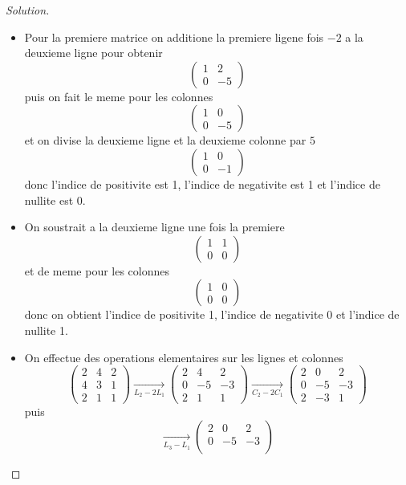 \documentclass[a4paper,12pt,french]{report}
\theoremstyle{plain}
\theoremstyle{definition}
\begin{document}
\begin{proof}[Solution]
\begin{itemize}
\item Pour la premiere matrice on additione la premiere ligene fois $-2$ a la deuxieme ligne pour obtenir
$$
\begin{pmatrix}
1 & 2 \\
0 & -5
\end{pmatrix}
$$
puis on fait le meme pour les colonnes 
$$
\begin{pmatrix}
1 & 0 \\
0 & -5
\end{pmatrix}
$$
et on divise la deuxieme ligne et la deuxieme colonne par $5$
$$
\begin{pmatrix}
 1 & 0 \\
0 & -1
\end{pmatrix}
$$
donc l'indice de positivite est 1, l'indice de negativite est 1 et l'indice de nullite est 0.
\item On soustrait a la deuxieme ligne une fois la premiere
$$
\begin{pmatrix}
1 & 1 \\
0 & 0
\end{pmatrix}
$$
et de meme pour les colonnes
$$
\begin{pmatrix}
1 & 0 \\
0 & 0
\end{pmatrix}
$$
donc on obtient l'indice de positivite 1, l'indice de negativite 0 et l'indice de nullite 1.
\item On effectue des operations elementaires sur les lignes et colonnes 
$$
\begin{pmatrix}
2 & 4 & 2 \\
4 & 3 & 1 \\
2 & 1 & 1
\end{pmatrix} \underset{L_{2}-2L_{1}}\longrightarrow \begin{pmatrix}
2 & 4 & 2 \\
0 & -5 & -3 \\
2 & 1 & 1
\end{pmatrix} \underset{C_{2}-2C_{1}}\longrightarrow \begin{pmatrix}
2 & 0 & 2 \\
0 & -5 & -3 \\
2 & -3 & 1
\end{pmatrix}
$$
puis
$$
\underset{L_{3}-L_{1}}\longrightarrow \begin{pmatrix}
2 & 0 & 2 \\
0 & -5 & -3 \\

\end{pmatrix}$$
\end{itemize}
\end{proof}
\end{document}
